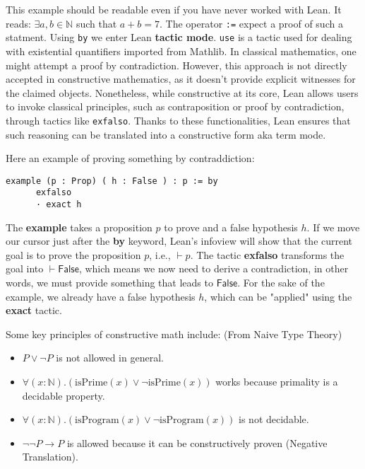 This example should be readable even if you have never worked with Lean.
It reads: $\exists a, b \in \mathbb{N}$ such that $a + b = 7$.
The operator \lstinline|:=| expect a proof of such a statment.
Using \lstinline|by| we enter Lean \textbf{tactic mode}.
\lstinline|use| is a tactic used for dealing with existential quantifiers imported from Mathlib.
In classical mathematics, one might attempt a proof by contradiction. 
However, this approach is not 
directly accepted in constructive mathematics, as it doesn't provide 
explicit witnesses for the claimed objects.
Nonetheless, while constructive at its core, Lean allows users to invoke classical principles, 
such as contraposition or proof by contradiction, through tactics like \lstinline|exfalso|. 
Thanks to these functionalities, Lean ensures that such reasoning can be translated 
into a constructive form aka term mode. 
\begin{example}
Here an example of proving something by contraddiction:
   \begin{lstlisting}[language=Lean]
    example (p : Prop) ( h : False ) : p := by
      exfalso
      · exact h
\end{lstlisting} 
The \textbf{example} takes a proposition $p$ to prove and a false hypothesis $h$.  
If we move our cursor just after the \textbf{by} keyword, Lean's infoview will show 
that the current goal is to prove the proposition $p$, i.e., $\vdash p$.  
The tactic \textbf{exfalso} transforms the goal into $\vdash \mathsf{False}$, which means we now need to derive a contradiction, in other words, we must provide something that leads to $\mathsf{False}$.  
For the sake of the example, we already have a false hypothesis $h$, which can be "applied" using the \textbf{exact} tactic.
\end{example}

Some key principles of constructive math include: (From Naive Type Theory)
\begin{itemize}
    \item $P \lor \neg P$ is not allowed in general.
    \item $\forall (x: \mathbb{N}) . (\text{isPrime}(x) \lor \neg \text{isPrime}(x))$ works because primality is a decidable property.
    \item $\forall (x: \mathbb{N}) . (\text{isProgram}(x) \lor \neg \text{isProgram}(x))$ is not decidable.
    \item $\neg \neg P \to P$ is allowed because it can be constructively proven (Negative Translation).
\end{itemize}

